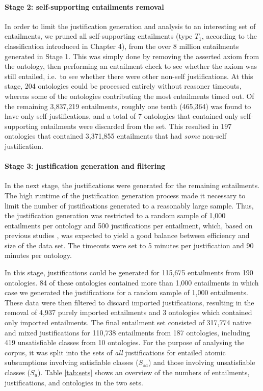 \paragraph{Stage 2: self-supporting entailments removal}
In order to limit the justification generation and analysis to an interesting set of entailments, we pruned all self-supporting entailments (type $T_{1}$, according to the classification introduced in Chapter 4), from the over 8 million entailments generated in Stage 1. This was simply done by removing the asserted axiom from the ontology, then performing an entailment check to see whether the axiom was still entailed, i.e.\ to see whether there were other non-self justifications. At this stage, 204 ontologies could be processed entirely without reasoner timeouts, whereas some of the ontologies contributing the most entailments timed out. Of the remaining 3,837,219 entailments, roughly one tenth  (465,364) was found to have only self-justifications, and a total of 7 ontologies that contained only self-supporting entailments were discarded from the set. This resulted in 197 ontologies that contained 3,371,855 entailments that had \emph{some} non-self justification.


\paragraph{Stage 3: justification generation and filtering}

In the next stage, the justifications were generated for the remaining entailments. The high runtime of the justification generation process made it necessary to limit the number of justifications generated to a reasonably large sample. Thus, the justification generation was restricted to a random sample of 1,000 entailments per ontology and 500 justifications per entailment, which, based on previous studies \cite{bail11jm}, was expected to yield a good balance between efficiency and size of the data set. The timeouts were set to 5 minutes per justification and 90 minutes per ontology.

In this stage, justifications could be generated for 115,675 entailments from 190 ontologies. 84 of these ontologies contained more than 1,000 entailments in which case we generated the justifications for a random sample of 1,000 entailments. These data were then filtered to discard imported justifications, resulting in the removal of 4,937 purely imported entailments and 3 ontologies which contained only imported entailments. The final entailment set consisted of 317,774 native and mixed justifications for 110,738 entailments from 187 ontologies, including 419 unsatisfiable classes from 10 ontologies. For the purpose of analysing the corpus, it was split into the sets of \emph{all} justifications for entailed atomic subsumptions involving satisfiable classes ($S_{sa}$) and those involving unsatisfiable classes ($S_{u}$). Table \ref{tab:sets} shows an overview of the numbers of entailments, justifications, and ontologies in the two sets.

